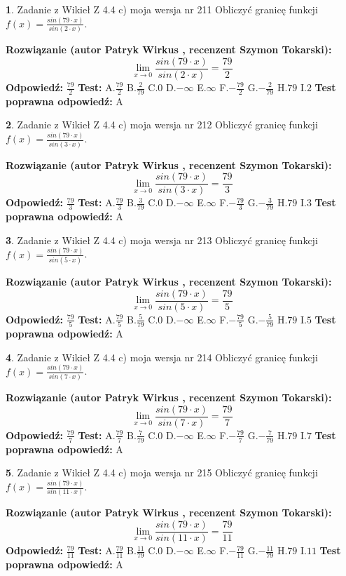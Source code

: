 \documentclass[12pt, a4paper]{article}
\theoremstyle{definition} %
\newtheorem{zad}{}
\newcommand{\zadStart}[1]{\begin{zad}#1\newline}
\newcommand{\zadStop}{\end{zad}}
\newcommand{\rozwStart}[2]{\noindent \textbf{Rozwiązanie (autor #1 , recenzent #2): }\newline}
\newcommand{\rozwStop}{\newline}
\newcommand{\odpStart}{\noindent \textbf{Odpowiedź:}\newline}
\newcommand{\odpStop}{\newline}
\newcommand{\testStart}{\noindent \textbf{Test:}\newline}
\newcommand{\testStop}{\newline}
\newcommand{\kluczStart}{\noindent \textbf{Test poprawna odpowiedź:}\newline}
\newcommand{\kluczStop}{\newline}
\begin{document}
\zadStart{Zadanie z Wikieł Z 4.4 c) moja wersja nr 211}
Obliczyć granicę funkcji $f(x)=\frac{sin(79\cdot x)}{sin(2\cdot x)}$.
\zadStop
\rozwStart{Patryk Wirkus}{Szymon Tokarski}
$$\lim\limits_{x\to 0}\frac{sin(79\cdot x)}{sin(2\cdot x)}=
\frac{79}{2}$$
\rozwStop
\odpStart
$\frac{79}{2}$
\odpStop
\testStart
A.$\frac{79}{2}$
B.$\frac{2}{79}$
C.$0$
D.$-\infty$
E.$\infty$
F.$-\frac{79}{2}$
G.$-\frac{2}{79}$
H.$79$
I.$2$
\testStop
\kluczStart
A
\kluczStop



\zadStart{Zadanie z Wikieł Z 4.4 c) moja wersja nr 212}
Obliczyć granicę funkcji $f(x)=\frac{sin(79\cdot x)}{sin(3\cdot x)}$.
\zadStop
\rozwStart{Patryk Wirkus}{Szymon Tokarski}
$$\lim\limits_{x\to 0}\frac{sin(79\cdot x)}{sin(3\cdot x)}=
\frac{79}{3}$$
\rozwStop
\odpStart
$\frac{79}{3}$
\odpStop
\testStart
A.$\frac{79}{3}$
B.$\frac{3}{79}$
C.$0$
D.$-\infty$
E.$\infty$
F.$-\frac{79}{3}$
G.$-\frac{3}{79}$
H.$79$
I.$3$
\testStop
\kluczStart
A
\kluczStop



\zadStart{Zadanie z Wikieł Z 4.4 c) moja wersja nr 213}
Obliczyć granicę funkcji $f(x)=\frac{sin(79\cdot x)}{sin(5\cdot x)}$.
\zadStop
\rozwStart{Patryk Wirkus}{Szymon Tokarski}
$$\lim\limits_{x\to 0}\frac{sin(79\cdot x)}{sin(5\cdot x)}=
\frac{79}{5}$$
\rozwStop
\odpStart
$\frac{79}{5}$
\odpStop
\testStart
A.$\frac{79}{5}$
B.$\frac{5}{79}$
C.$0$
D.$-\infty$
E.$\infty$
F.$-\frac{79}{5}$
G.$-\frac{5}{79}$
H.$79$
I.$5$
\testStop
\kluczStart
A
\kluczStop



\zadStart{Zadanie z Wikieł Z 4.4 c) moja wersja nr 214}
Obliczyć granicę funkcji $f(x)=\frac{sin(79\cdot x)}{sin(7\cdot x)}$.
\zadStop
\rozwStart{Patryk Wirkus}{Szymon Tokarski}
$$\lim\limits_{x\to 0}\frac{sin(79\cdot x)}{sin(7\cdot x)}=
\frac{79}{7}$$
\rozwStop
\odpStart
$\frac{79}{7}$
\odpStop
\testStart
A.$\frac{79}{7}$
B.$\frac{7}{79}$
C.$0$
D.$-\infty$
E.$\infty$
F.$-\frac{79}{7}$
G.$-\frac{7}{79}$
H.$79$
I.$7$
\testStop
\kluczStart
A
\kluczStop



\zadStart{Zadanie z Wikieł Z 4.4 c) moja wersja nr 215}
Obliczyć granicę funkcji $f(x)=\frac{sin(79\cdot x)}{sin(11\cdot x)}$.
\zadStop
\rozwStart{Patryk Wirkus}{Szymon Tokarski}
$$\lim\limits_{x\to 0}\frac{sin(79\cdot x)}{sin(11\cdot x)}=
\frac{79}{11}$$
\rozwStop
\odpStart
$\frac{79}{11}$
\odpStop
\testStart
A.$\frac{79}{11}$
B.$\frac{11}{79}$
C.$0$
D.$-\infty$
E.$\infty$
F.$-\frac{79}{11}$
G.$-\frac{11}{79}$
H.$79$
I.$11$
\testStop
\kluczStart
A
\kluczStop
\end{document}
